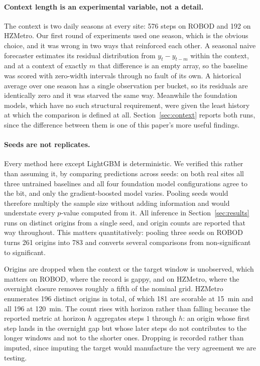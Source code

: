 \documentclass[11pt]{article}
\theoremstyle{plain}
\theoremstyle{definition}
\theoremstyle{remark}
\begin{document}
\paragraph{Context length is an experimental variable, not a detail.}
The context is two daily seasons at every site: \num{576} steps on ROBOD and \num{192} on HZMetro. Our first round of experiments used one season, which is the obvious choice, and it was wrong in two ways that reinforced each other. A seasonal naive forecaster estimates its residual distribution from $y_t - y_{t-m}$ within the context, and at a context of exactly $m$ that difference is an empty array, so the baseline was scored with zero-width intervals through no fault of its own. A historical average over one season has a single observation per bucket, so its residuals are identically zero and it was starved the same way. Meanwhile the foundation models, which have no such structural requirement, were given the least history at which the comparison is defined at all. Section~\ref{sec:context} reports both runs, since the difference between them is one of this paper's more useful findings.

\paragraph{Seeds are not replicates.}
Every method here except LightGBM is deterministic. We verified this rather than assuming it, by comparing predictions across seeds: on both real sites all three untrained baselines and all four foundation model configurations agree to the bit, and only the gradient-boosted model varies. Pooling seeds would therefore multiply the sample size without adding information and would understate every $p$-value computed from it. All inference in Section~\ref{sec:results} runs on distinct origins from a single seed, and origin counts are reported that way throughout. This matters quantitatively: pooling three seeds on ROBOD turns \num{261} origins into \num{783} and converts several comparisons from non-significant to significant.

Origins are dropped when the context or the target window is unobserved, which matters on ROBOD, where the record is gappy, and on HZMetro, where the overnight closure removes roughly a fifth of the nominal grid. HZMetro enumerates \num{196} distinct origins in total, of which \num{181} are scorable at \SI{15}{\minute} and all \num{196} at \SI{120}{\minute}. The count rises with horizon rather than falling because the reported metric at horizon $h$ aggregates steps $1$ through $h$: an origin whose first step lands in the overnight gap but whose later steps do not contributes to the longer windows and not to the shorter ones. Dropping is recorded rather than imputed, since imputing the target would manufacture the very agreement we are testing.
\end{document}
